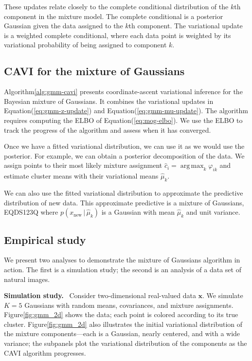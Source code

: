 \documentclass{article}
\DeclareRobustCommand{\parhead}[1]{\textbf{#1}~}
\begin{document}
These updates relate closely to the complete conditional distribution
of the $k$th component in the mixture model. The complete conditional
is a posterior Gaussian given the data assigned to the $k$th
component. The variational update is a weighted complete conditional,
where each data point is weighted by its variational probability of
being assigned to component $k$.

\subsection{CAVI for the mixture of Gaussians}

Algorithm\nobreakspace \ref {alg:gmm-cavi} presents coordinate-ascent variational inference
for the Bayesian mixture of Gaussians.  It combines the variational
updates in Equation\nobreakspace \textup {(\ref {eq:gmm-z-update})} and Equation\nobreakspace \textup {(\ref {eq:gmm-mu-update})}.  The
algorithm requires computing the \gls{ELBO} of Equation\nobreakspace \textup {(\ref {eq:mog-elbo})}.  We
use the \gls{ELBO} to track the progress of the algorithm and assess
when it has converged.

Once we have a fitted variational distribution, we can use it as we
would use the posterior. For example, we can obtain a posterior
decomposition of the data. We assign points to their most likely
mixture assignment $\hat{c}_i = \operatorname*{arg\,max}_{k} \varphi_{ik}$ and estimate
cluster means with their variational means $\hat{\mu}_k$.

We can also use the fitted variational distribution to approximate the
predictive distribution of new data.  This approximate predictive is a
mixture of Gaussians,
EQDS123Q
where $p(x_{\textrm{new}} {\,\vert\,} \hat{\mu}_k)$ is a Gaussian with 
mean $\hat{\mu}_k$ and unit variance.

\subsection{Empirical study}
\label{sec:gaussian-study}

We present two analyses to demonstrate the mixture of Gaussians
algorithm in action.  The first is a simulation study; the second is
an analysis of a data set of natural images.

\parhead{Simulation study.} Consider two-dimensional real-valued data
${\mathbf{x}}$. We simulate $K=5$ Gaussians with random means, covariances, and
mixture assignments. Figure\nobreakspace \ref {fig:gmm_2d} shows the data; each point is
colored according to its true cluster.  Figure\nobreakspace \ref {fig:gmm_2d} also
illustrates the initial variational distribution of the mixture
components---each is a Gaussian, nearly centered, and with a wide
variance; the subpanels plot the variational distribution of the
components as the \gls{CAVI} algorithm progresses.
\end{document}
